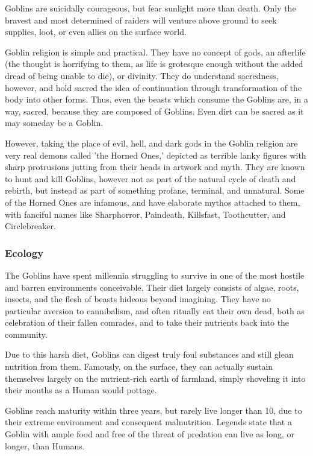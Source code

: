 \documentclass[oneside,11pt,english]{book}
\begin{document}
Goblins are suicidally courageous, but fear sunlight more than death. Only the
bravest and most determined of raiders will venture above ground to seek
supplies, loot, or even allies on the surface world.

Goblin religion is simple and practical. They have no concept of gods, an
afterlife (the thought is horrifying to them, as life is grotesque enough
without the added dread of being unable to die), or divinity. They do understand
sacredness, however, and hold sacred the idea of continuation through
transformation of the body into other forms. Thus, even the beasts which consume
the Goblins are, in a way, sacred, because they are composed of Goblins. Even
dirt can be sacred as it may someday be a Goblin.

However, taking the place of evil, hell, and dark gods in the Goblin religion
are very real demons called 'the Horned Ones,' depicted as terrible lanky
figures with sharp protrusions jutting from their heads in artwork and myth.
They are known to hunt and kill Goblins, however not as part of the natural
cycle of death and rebirth, but instead as part of something profane, terminal,
and unnatural. Some of the Horned Ones are infamous, and have elaborate mythos
attached to them, with fanciful names like Sharphorror, Paindeath, Killsfast,
Toothcutter, and Circlebreaker.
\subsubsection*{Ecology} 
The Goblins have spent millennia struggling to survive in one of the most
hostile and barren environments conceivable. Their diet largely consists of
algae, roots, insects, and the flesh of beasts hideous beyond imagining. They
have no particular aversion to cannibalism, and often ritually eat their own
dead, both as celebration of their fallen comrades, and to take their nutrients
back into the community.


Due to this harsh diet, Goblins can digest truly foul substances and still glean
nutrition from them. Famously, on the surface, they can actually sustain
themselves largely on the nutrient-rich earth of farmland, simply shoveling it
into their mouths as a Human would pottage.


Goblins reach maturity within three years, but rarely live longer than 10, due
to their extreme environment and consequent malnutrition. Legends state that a
Goblin with ample food and free of the threat of predation can live as long, or
longer, than Humans.
\end{document}
